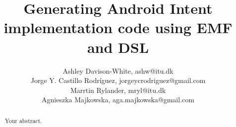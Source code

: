 \documentclass[12pt]{article}
\title{Generating Android Intent implementation code using EMF and DSL}
\author{Ashley Davison-White, ashw@itu.dk 
        \\Jorge Y. Castillo Rodríguez, jorgeycrodriguez@gmail.com
        \\Marrtin Rylander, mryl@itu.dk
        \\Agnieszka Majkowska, aga.majkowska@gmail.com
}
\begin{document}
\maketitle

\begin{abstract}
Your abstract.
\end{abstract}




















\end{document}
